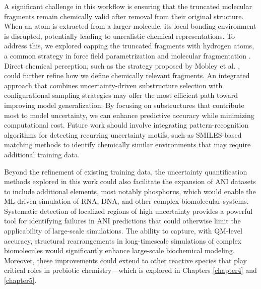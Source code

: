 A significant challenge in this workflow is ensuring that the truncated molecular fragments remain chemically valid after removal from their original structure.
When an atom is extracted from a larger molecule, its local bonding environment is disrupted, potentially leading to unrealistic chemical representations.
To address this, we explored capping the truncated fragments with hydrogen atoms, a common strategy in force field parametrization and molecular fragmentation \cite{protein_ff_fragmentation_nn_wang}.
Direct chemical perception, such as the strategy proposed by Mobley et al. \cite{direct_chem_perception_mobley}, could further refine how we define chemically relevant fragments.
An integrated approach that combines uncertainty-driven substructure selection with configurational sampling strategies may offer the most efficient path toward improving model generalization.
By focusing on substructures that contribute most to model uncertainty, we can enhance predictive accuracy while minimizing computational cost. 
Future work should involve integrating pattern-recognition algorithms for detecting recurring uncertainty motifs, such as SMILES-based matching methods \cite{SMILES_pair_encoding_li} to identify chemically similar environments that may require additional training data. 

Beyond the refinement of existing training data, the uncertainty quantification methods explored in this work could also facilitate the expansion of ANI datasets to include additional elements, most notably phosphorus, which would enable the ML-driven simulation of RNA, DNA, and other complex biomolecular systems. 
Systematic detection of localized regions of high uncertainty provides a powerful tool for identifying failures in ANI predictions that could otherwise limit the applicability of large-scale simulations. 
The ability to capture, with QM-level accuracy, structural rearrangements in long-timescale simulations of complex biomolecules would significantly enhance large-scale biochemical modeling. 
Moreover, these improvements could extend to other reactive species that play critical roles in prebiotic chemistry---which is explored in Chapters \ref{chapter4} and \ref{chapter5}.
